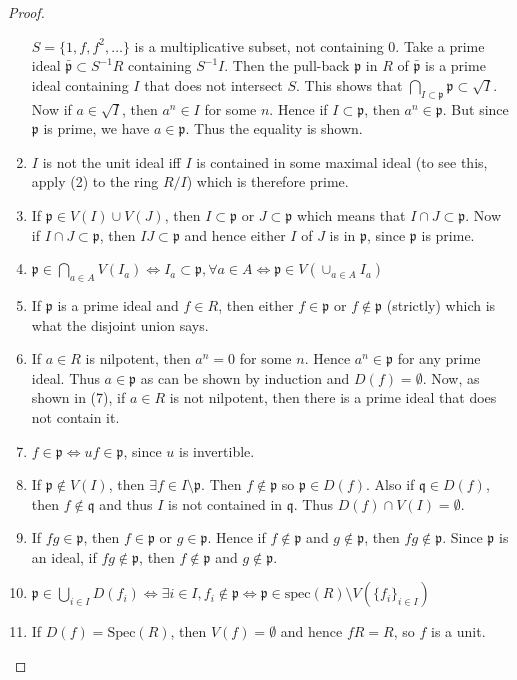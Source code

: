 \begin{proof}
\begin{enumerate}
$S = \{1, f, f^2, \ldots\}$ is a multiplicative subset, not containing $0$.
Take a
prime ideal $\bar{\mathfrak{p}} \subset S^{-1}R$ containing $S^{-1}I$. Then the
pull-back $\mathfrak{p}$ in $R$ of $\bar{\mathfrak{p}}$ is a prime ideal
containing $I$ that does not intersect $S$. This shows that $\bigcap_{I \subset
\mathfrak p} \mathfrak p \subset \sqrt{I}$. Now if $a \in \sqrt{I}$, then $a^n
\in I$ for some $n$. Hence if $I \subset \mathfrak{p}$, then $a^n \in
\mathfrak{p}$. But since $\mathfrak{p}$ is prime, we have $a \in \mathfrak{p}$.
Thus the equality is shown.
\item $I$ is not the unit ideal iff $I$ is contained in some maximal ideal (to
see this, apply (2) to the ring $R/I$) which is therefore prime.
\item If $\mathfrak{p} \in V(I) \cup V(J)$, then $I \subset \mathfrak{p}$ or $J
\subset \mathfrak{p}$ which means that $I \cap J \subset \mathfrak{p}$. Now if
$I \cap J \subset \mathfrak{p}$, then $IJ \subset \mathfrak{p}$ and hence
either $I$ of $J$ is in $\mathfrak{p}$, since $\mathfrak{p}$ is prime.
\item $\mathfrak{p} \in \bigcap_{a \in A} V(I_a) \Leftrightarrow I_a \subset
\mathfrak{p}, \forall a \in A \Leftrightarrow \mathfrak{p} \in V(\cup_{a\in A}
I_a)$
\item If $\mathfrak{p}$ is a prime ideal and $f \in R$, then either $f \in
\mathfrak{p}$ or $f \notin \mathfrak{p}$ (strictly) which is what the disjoint
union says.
\item If $a \in R$ is nilpotent, then $a^n = 0$ for some $n$. Hence $a^n \in
\mathfrak{p}$ for any prime ideal. Thus $a \in \mathfrak{p}$ as can be shown by
induction and $D(f) = \emptyset$. Now, as shown in (7), if $a \in R$ is not
nilpotent, then there is a prime ideal that does not contain it.
\item $f \in \mathfrak{p} \Leftrightarrow uf \in \mathfrak{p}$, since $u$ is
invertible.
\item If $\mathfrak{p} \notin V(I)$, then $\exists f \in I \setminus
\mathfrak{p}$. Then $f \notin \mathfrak{p}$ so $\mathfrak{p} \in D(f)$. Also if
$\mathfrak{q} \in D(f)$, then $f \notin \mathfrak{q}$ and thus $I$ is not
contained in $\mathfrak{q}$. Thus $D(f) \cap V(I) = \emptyset$.
\item If $fg \in \mathfrak{p}$, then $f \in \mathfrak{p}$ or $g \in
\mathfrak{p}$. Hence if $f \notin \mathfrak{p}$ and $g \notin \mathfrak{p}$,
then $fg \notin \mathfrak{p}$. Since $\mathfrak{p}$ is an ideal, if $fg \notin
\mathfrak{p}$, then $f \notin \mathfrak{p}$ and $g \notin \mathfrak{p}$.
\item $\mathfrak{p} \in \bigcup_{i \in I} D(f_i) \Leftrightarrow \exists i \in
I, f_i \notin \mathfrak{p} \Leftrightarrow \mathfrak{p} \in \mathrm{spec}(R)
\setminus V(\{f_i\}_{i \in I})$
\item If $D(f) = \text{Spec}(R)$, then $V(f) = \emptyset$ and
hence $fR = R$, so $f$ is a unit.
\end{enumerate}
\end{proof}

